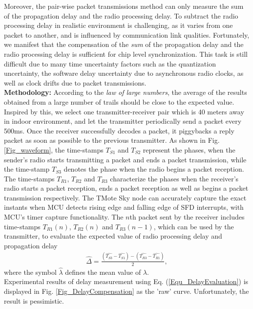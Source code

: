 \documentclass[conference]{IEEEtran}
\begin{document}
Moreover, the pair-wise packet transmissions method can only measure the sum of the propagation delay and the radio processing delay.
To subtract the radio processing delay in realistic environment is challenging, as it varies from one packet to another, and is influenced by communication link qualities.
Fortunately, we manifest that the compensation of the \emph{sum} of the propagation delay and the radio processing delay is sufficient for chip level synchronization.
This task is still difficult due to many time uncertainty factors such as the quantization uncertainty, the software delay uncertainty due to asynchronous radio clocks, as well as clock drifts due to packet transmissions.\\
\indent \textbf{Methodology:} According to the \emph{law of large numbers}, the average of the results obtained from a large number of trails should be close to the expected value.
Inspired by this, we select one transmitter-receiver pair which is 40 meters away in indoor environment, and let the transmitter periodically send a packet every 500ms.
Once the receiver successfully decodes a packet, it piggybacks a reply packet as soon as possible to the previous transmitter.
As shown in Fig. \ref{Fig_waveform}, the time-stamps $T_{S1}$ and $T_{S2}$ represent the phases, when the sender's radio starts transmitting a packet and ends a packet transmission, while the time-stamp $T_{S3}$ denotes the phase when the radio begins a packet reception.
The time-stamps $T_{R1}$, $T_{R2}$ and $T_{R3}$ characterize the phases when the receiver's radio starts a packet reception, ends a packet reception as well as begins a packet transmission respectively.
The TMote Sky node can accurately capture the exact instants when MCU detects rising edge and falling edge of SFD interrupts, with MCU's timer capture functionality.
The $n$th packet sent by the receiver includes time-stamps $T_{R1}(n)$, $T_{R2}(n)$ and $T_{R3}(n-1)$, which can be used by the transmitter, to evaluate the expected value of radio processing delay and propagation delay
\begin{align}
\label{Equ_DelayEvaluation}
\widehat{\Delta}=\frac{(\widehat{T_{S3}}-\widehat{T_{S1}})-(\widehat{T_{R3}}-\widehat{T_{R1}})}{2},
\end{align}
where the symbol $\widehat{\lambda}$ defines the mean value of $\lambda$.\\
\indent Experimental results of delay measurement using Eq. (\ref{Equ_DelayEvaluation}) is displayed in Fig. \ref{Fig_DelayCompensation} as the 'raw' curve.
Unfortunately, the result is pessimistic.
\end{document}
